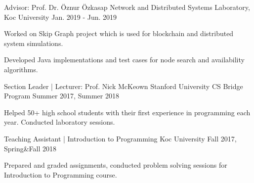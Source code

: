 
\begin{cventries}
  \cvopenentry
    {Advisor: Prof. Dr. Öznur Özkasap} %
    {Network and Distributed Systems Laboratory, Koc University} %
    {}
    {Jan. 2019 - Jun. 2019} %
    {
      \begin{cvitems} %
        \item {Worked on Skip Graph project which is used for blockchain and distributed system simulations.}
        \item {Developed Java implementations and test cases for node search and availability algorithms.}
      \end{cvitems}
    }

  \cvopenentry
    {Section Leader | Lecturer: Prof. Nick McKeown } %
    {Stanford University CS Bridge Program} %
    {}
    {Summer 2017, Summer 2018} %
    {
      \begin{cvitems} %
        \item {Helped 50+ high school students with their first experience in programming each year. Conducted laboratory sessions.}
      \end{cvitems}
    }

  \cvopenentry
    {Teaching Assistant | Introduction to Programming } %
    {Koc University} %
    {}
    {Fall 2017, Spring\&Fall 2018} %
    {
      \begin{cvitems} %
        \item {Prepared and graded assignments, conducted problem solving sessions for Introduction to Programming course.}
      \end{cvitems}
    }


\end{cventries}
